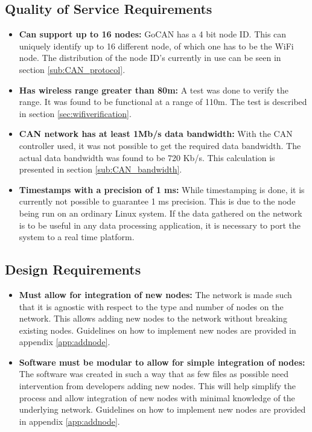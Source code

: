 \subsection{Quality of Service Requirements}
\begin{itemize}
	\item[\cmark] \textbf{Can support up to 16 nodes:}
	GoCAN has a 4 bit node ID.
	This can uniquely identify up to 16 different node, of which one has to be the WiFi node.
	The distribution of the node ID's currently in use can be seen in section \ref{sub:CAN_protocol}.
	\item[\cmark] \textbf{Has wireless range greater than 80m:}
	A test was done to verify the range.
	It was found to be functional at a range of 110m.
	The test is described in section \ref{sec:wifiverification}.
	\item[\xmark] \textbf{CAN network has at least 1Mb/s data bandwidth:}
	With the CAN controller used, it was not possible to get the required data bandwidth.
	The actual data bandwidth was found to be 720 Kb/s.
	This calculation is presented in section \ref{sub:CAN_bandwidth}.
	\item[\xmark] \textbf{Timestamps with a precision of 1 ms:}
	While timestamping is done, it is currently not possible to guarantee 1 ms precision.
	This is due to the node being run on an ordinary Linux system.
	If the data gathered on the network is to be useful in any data processing application, it is necessary to port the system to a real time platform.
\end{itemize}

\subsection{Design Requirements}
\begin{itemize}
	\item[\cmark] \textbf{Must allow for integration of new nodes:}
	The network is made such that it is agnostic with respect to the type and number of nodes on the network.
	This allows adding new nodes to the network without breaking existing nodes.
	Guidelines on how to implement new nodes are provided in appendix \ref{app:addnode}.
	\item[\cmark] \textbf{Software must be modular to allow for simple integration of nodes:}
	The software was created in such a way that as few files as possible need intervention from developers adding new nodes.
	This will help simplify the process and allow integration of new nodes with minimal knowledge of the underlying network.
	Guidelines on how to implement new nodes are provided in appendix \ref{app:addnode}.
\end{itemize}

